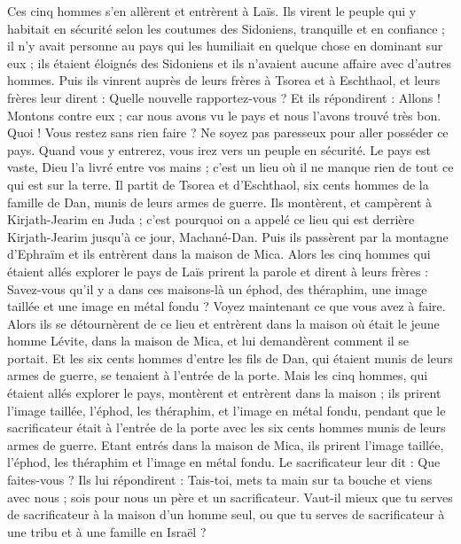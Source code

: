 \begin{multicols}{2}
Ces cinq hommes s'en allèrent et entrèrent à Laïs. Ils virent le peuple qui y habitait en sécurité selon les coutumes des Sidoniens, tranquille et en confiance ; il n'y avait personne au pays qui les humiliait en quelque chose en dominant sur eux ; ils étaient éloignés des Sidoniens et ils n'avaient aucune affaire avec d'autres hommes.
Puis ils vinrent auprès de leurs frères à Tsorea et à Eschthaol, et leurs frères leur dirent : Quelle nouvelle rapportez-vous ?
Et ils répondirent : Allons ! Montons contre eux ; car nous avons vu le pays et nous l'avons trouvé très bon. Quoi ! Vous restez sans rien faire ? Ne soyez pas paresseux pour aller posséder ce pays.
Quand vous y entrerez, vous irez vers un peuple en sécurité. Le pays est vaste, Dieu l'a livré entre vos mains ; c'est un lieu où il ne manque rien de tout ce qui est sur la terre.
Il partit de Tsorea et d'Eschthaol, six cents hommes de la famille de Dan, munis de leurs armes de guerre.
Ils montèrent, et campèrent à Kirjath-Jearim en Juda ; c'est pourquoi on a appelé ce lieu qui est derrière Kirjath-Jearim jusqu'à ce jour, Machané-Dan.
Puis ils passèrent par la montagne d'Ephraïm et ils entrèrent dans la maison de Mica.
Alors les cinq hommes qui étaient allés explorer le pays de Laïs prirent la parole et dirent à leurs frères : Savez-vous qu'il y a dans ces maisons-là un éphod, des théraphim, une image taillée et une image en métal fondu ? Voyez maintenant ce que vous avez à faire.
Alors ils se détournèrent de ce lieu et entrèrent dans la maison où était le jeune homme Lévite, dans la maison de Mica, et lui demandèrent comment il se portait.
Et les six cents hommes d'entre les fils de Dan, qui étaient munis de leurs armes de guerre, se tenaient à l'entrée de la porte.
Mais les cinq hommes, qui étaient allés explorer le pays, montèrent et entrèrent dans la maison ; ils prirent l'image taillée, l'éphod, les théraphim, et l'image en métal fondu, pendant que le sacrificateur était à l'entrée de la porte avec les six cents hommes munis de leurs armes de guerre.
Etant entrés dans la maison de Mica, ils prirent l'image taillée, l'éphod, les théraphim et l'image en métal fondu. Le sacrificateur leur dit : Que faites-vous ?
Ils lui répondirent : Tais-toi, mets ta main sur ta bouche et viens avec nous ; sois pour nous un père et un sacrificateur. Vaut-il mieux que tu serves de sacrificateur à la maison d'un homme seul, ou que tu serves de sacrificateur à une tribu et à une famille en Israël ?

\end{multicols}
